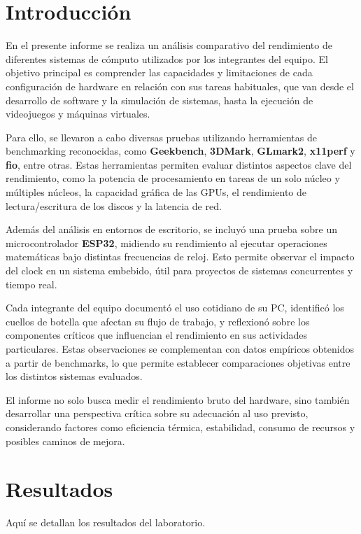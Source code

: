 \documentclass[a4paper,12pt]{article}
\begin{document}


\section{Introducción}

En el presente informe se realiza un análisis comparativo del rendimiento de diferentes sistemas de cómputo utilizados por los integrantes del equipo. El objetivo principal es comprender las capacidades y limitaciones de cada configuración de hardware en relación con sus tareas habituales, que van desde el desarrollo de software y la simulación de sistemas, hasta la ejecución de videojuegos y máquinas virtuales.

Para ello, se llevaron a cabo diversas pruebas utilizando herramientas de benchmarking reconocidas, como \textbf{Geekbench}, \textbf{3DMark}, \textbf{GLmark2}, \textbf{x11perf} y \textbf{fio}, entre otras. Estas herramientas permiten evaluar distintos aspectos clave del rendimiento, como la potencia de procesamiento en tareas de un solo núcleo y múltiples núcleos, la capacidad gráfica de las GPUs, el rendimiento de lectura/escritura de los discos y la latencia de red.

Además del análisis en entornos de escritorio, se incluyó una prueba sobre un microcontrolador \textbf{ESP32}, midiendo su rendimiento al ejecutar operaciones matemáticas bajo distintas frecuencias de reloj. Esto permite observar el impacto del clock en un sistema embebido, útil para proyectos de sistemas concurrentes y tiempo real.

Cada integrante del equipo documentó el uso cotidiano de su PC, identificó los cuellos de botella que afectan su flujo de trabajo, y reflexionó sobre los componentes críticos que influencian el rendimiento en sus actividades particulares. Estas observaciones se complementan con datos empíricos obtenidos a partir de benchmarks, lo que permite establecer comparaciones objetivas entre los distintos sistemas evaluados.

El informe no solo busca medir el rendimiento bruto del hardware, sino también desarrollar una perspectiva crítica sobre su adecuación al uso previsto, considerando factores como eficiencia térmica, estabilidad, consumo de recursos y posibles caminos de mejora.


\newpage

\section{Resultados}
Aquí se detallan los resultados del laboratorio.
\end{document}
